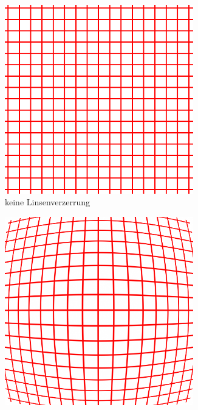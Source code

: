 \begin{figure}[!htb]
	\centering
	\begin{subfigure}{.33\textwidth}
		\centering
		\includegraphics[width=0.9\textwidth]{images/undistorted.png}
		\caption{keine Linsenverzerrung}
		\label{fig:undist}
	\end{subfigure}%
	\begin{subfigure}{.33\textwidth}
		\centering
		\includegraphics[width=0.9\textwidth]{images/barrelDistortion.png}

\end{subfigure}
\end{figure}
